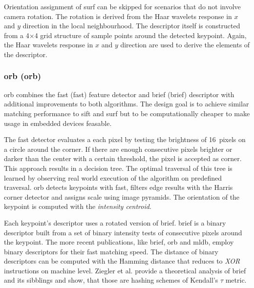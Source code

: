 Orientation assignment of \acrshort{surf} can be skipped for scenarios that do not involve camera rotation.
The rotation is derived from the Haar wavelets\cite{haar_1911} response in $x$ and $y$ direction in the local neighbourhood.
The descriptor itself is constructed from a 4$\times$4 grid structure of sample points around the detected keypoint.
Again, the Haar wavelets response in $x$ and $y$ direction are used to derive the elements of the descriptor.

\subsubsection{\acrshort{orb} (\acrlong{orb})}

\acrshort{orb}\cite{rublee_iccv11} combines the \acrshort{fast}\cite{rosten_eccv06} (\acrlong{fast}) feature detector and \acrshort{brief}\cite{calonder_eccv10} (\acrlong{brief}) descriptor with additional improvements to both algorithms.
The design goal is to achieve similar matching performance to \acrshort{sift} and \acrshort{surf} but to be computationally cheaper to make usage in embedded devices feasable.

The \acrshort{fast} detector evaluates a each pixel by testing the brightness of 16~pixels on a circle around the corner.
If there are enough consecutive pixels brighter or darker than the center with a certain threshold, the pixel is accepted as corner.
This approach results in a decision tree.
The optimal traversal of this tree is learned by observing real world execution of the algorithm on predefined traversal.
\acrshort{orb} detects keypoints with \acrshort{fast}, filters edge results with the Harris corner detector\cite{harris_1988} and assigns scale using image pyramids.
The orientation of the keypoint is computed with the \emph{intensity centroid}\cite{rosin_cviu99}.

Each keypoint's descriptor uses a rotated version of \acrshort{brief}.
\acrshort{brief} is a binary descriptor built from a set of binary intensity tests of consecutive pixels around the keypoint.
The more recent publications, like \acrshort{brief}, \acrshort{orb} and \acrshort{mldb}, employ binary descriptors for their fast matching speed.
The distance of binary descriptors can be computed with the Hamming distance that reduces to \emph{XOR} instructions on machine level.
Ziegler et al.\cite{ziegler_anips2012} provide a theoretical analysis of \acrshort{brief} and its sibblings and show, that those are hashing schemes of Kendall's $\tau$ metric\cite{kendall_1938}.

